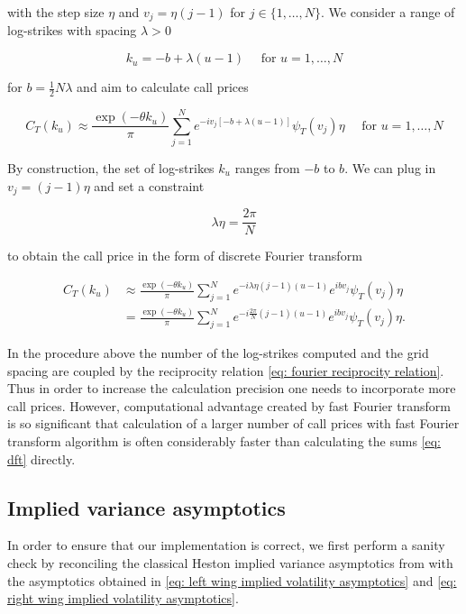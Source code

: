 \documentclass[12pt,twoside]{article}
\theoremstyle{plain}
\theoremstyle{plain}
\theoremstyle{definition}
\theoremstyle{remark}
\numberwithin{equation}{section}
\begin{document}
with the step size $\eta$ and $v_{j}=\eta(j-1)$ for $j \in \{1, \dots, N\}$. We consider a range of log-strikes with spacing $\lambda > 0$

$$
k_{u}=-b+\lambda(u-1) \quad \text { for } u=1, \ldots, N
$$

\vspace{5pt}

for $b=\frac{1}{2} N \lambda$ and aim to calculate call prices 

$$
C_{T}\left(k_{u}\right) \approx \frac{\exp \left(-\theta k_{u}\right)}{\pi} \sum_{j=1}^{N} e^{-i v_{j}[-b+\lambda(u-1)]} \psi_{T}\left(v_{j}\right) \eta \quad \text { for } u=1, \ldots, N
$$

By construction, the set of log-strikes $k_u$ ranges from $-b$ to $b$. We can plug in $v_{j}=(j-1) \eta$ and set a constraint

\begin{equation}
\label{eq: fourier reciprocity relation}
\lambda \eta=\frac{2 \pi}{N}
\end{equation}

to obtain the call price in the form of discrete Fourier transform

$$
\begin{aligned}
C_{T}\left(k_{u}\right) &\approx \frac{\exp \left(-\theta k_{u}\right)}{\pi} \sum_{j=1}^{N} e^{-i \lambda \eta(j-1)(u-1)} e^{i b v_{j}} \psi_{T}\left(v_{j}\right) \eta \\[5pt]
&= \frac{\exp \left(-\theta k_{u}\right)}{\pi} \sum_{j=1}^{N} e^{-i \frac{2\pi}{N} (j-1)(u-1)} e^{i  b v_{j}} \psi_{T}\left(v_{j}\right) \eta.
\end{aligned}
$$

In the procedure above the number of the log-strikes computed and the grid spacing are coupled by the reciprocity relation \eqref{eq: fourier reciprocity relation}. Thus in order to increase the calculation precision one needs to incorporate more call prices. However, computational advantage created by fast Fourier transform is so significant that calculation of a larger number of call prices with fast Fourier transform algorithm is often considerably faster than calculating the sums \eqref{eq: dft} directly.

\subsection{Implied variance asymptotics}

In order to ensure that our implementation is correct, we first perform a sanity check by reconciling the classical Heston implied variance asymptotics from \cite{FGGS10} with the asymptotics obtained in \eqref{eq: left wing implied volatility asymptotics} and \eqref{eq: right wing implied volatility asymptotics}.
\end{document}
